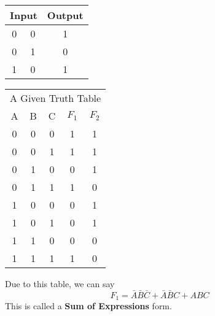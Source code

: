 \documentclass{article}
\begin{document}
\begin{center}
	\begin{tabular}{ccc}
		\toprule
		\multicolumn{2}{c}{Input} & Output \\
		\midrule
		0 & 0 & 1 \\
		0 & 1 & 0 \\
		1 & 0 & 1 \\
		\bottomrule
	\end{tabular}

	\bigskip
	\bigskip
	\bigskip

	\begin{tabular}{ccccc}
		\toprule
		\multicolumn{5}{c}{A Given Truth Table}\\
		\cmidrule{1-5}
		A & B & C & \[ F_{1}\] & \[ F_{2}\] \\
		\midrule
		0 & 0 & 0 & 1 & 1 \\
		0 & 0 & 1 & 1 & 1 \\
		0 & 1 & 0 & 0 & 1 \\
		0 & 1 & 1 & 1 & 0 \\
		1 & 0 & 0 & 0 & 1 \\
		1 & 0 & 1 & 0 & 1 \\
		1 & 1 & 0 & 0 & 0 \\
		1 & 1 & 1 & 1 & 0 \\
		\bottomrule
	\end{tabular}
\end{center}
Due to this table, we can say \[ F_{1} = \bar{A} \bar{B} \bar{C} + \bar{A} \bar{B} C + ABC \]
This is called a \textbf{Sum of Expressions} form.
\end{document}
